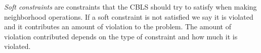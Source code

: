 \emph{Soft constraints} are constraints that the CBLS should try to satisfy when making neighborhood operations. If a 
soft constraint is not satisfied we say it is violated and it contributes an amount of violation to the problem. The 
amount of violation contributed depends on the type of constraint and how much it is violated. \\ 
